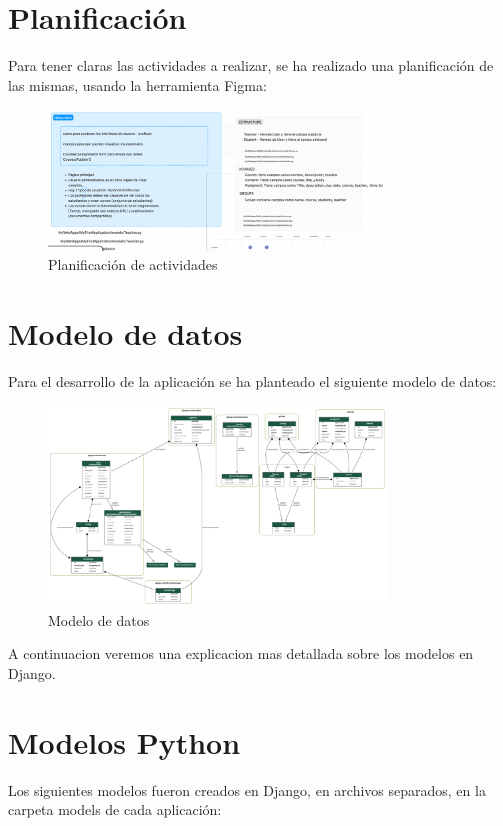 \section{Planificación}
Para tener claras las actividades a realizar, se ha realizado una planificación de las mismas, usando la herramienta Figma: 
\begin{figure}[H]
  \centering
  \includegraphics[width=0.8\textwidth]{img/planificacion.png}
  \caption{Planificación de actividades}
\end{figure}

\section{Modelo de datos}
Para el desarrollo de la aplicación se ha planteado el siguiente modelo de datos:
\begin{figure}[H]
  \centering
  \includegraphics[width=0.8\textwidth]{img/diagrama.png}
  \caption{Modelo de datos}
\end{figure}

A continuacion veremos una explicacion mas detallada sobre los modelos en Django.

\section{Modelos Python}
Los siguientes modelos fueron creados en Django, en archivos separados, en la carpeta models de cada aplicación:

